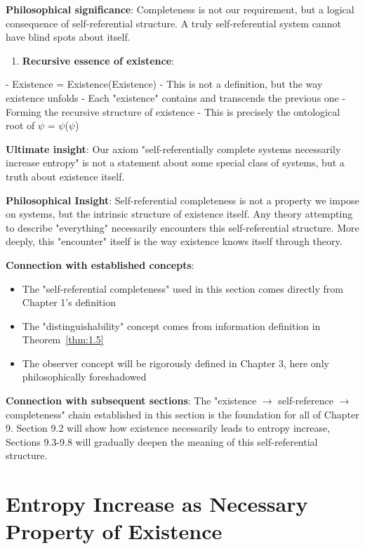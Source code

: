    \textbf{Philosophical significance}: Completeness is not our requirement,
   but a logical consequence of self-referential structure.
   A truly self-referential system cannot have blind spots about itself.

\begin{enumerate}
\item \textbf{Recursive essence of existence}:
\end{enumerate}
   - Existence = Existence(Existence)
   - This is not a definition, but the way existence unfolds
   - Each "existence" contains and transcends the previous one
   - Forming the recursive structure of existence
   - This is precisely the ontological root of $\psi$ = $\psi$($\psi$)
   
   \textbf{Ultimate insight}: Our axiom "self-referentially complete systems necessarily increase entropy"
   is not a statement about some special class of systems,
   but a truth about existence itself.

\textbf{Philosophical Insight}:
Self-referential completeness is not a property we impose on systems, but the intrinsic structure of existence itself.
Any theory attempting to describe "everything" necessarily encounters this self-referential structure.
More deeply, this "encounter" itself is the way existence knows itself through theory.

\textbf{Connection with established concepts}:
\begin{itemize}
\item The "self-referential completeness" used in this section comes directly from Chapter 1's definition
\item The "distinguishability" concept comes from information definition in Theorem~\ref{thm:1.5}
\item The observer concept will be rigorously defined in Chapter 3, here only philosophically foreshadowed
\end{itemize}

\textbf{Connection with subsequent sections}:
The "existence $\rightarrow$ self-reference $\rightarrow$ completeness" chain established in this section is the foundation for all of Chapter 9.
Section 9.2 will show how existence necessarily leads to entropy increase,
Sections 9.3-9.8 will gradually deepen the meaning of this self-referential structure.

\section{Entropy Increase as Necessary Property of Existence}
\label{sec:ch09_philosophy:entropy-increase-as-necessary-property-of-existence}


